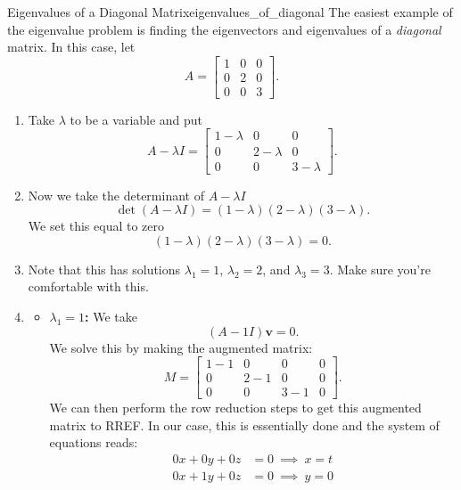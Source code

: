         \begin{ex}{Eigenvalues of a Diagonal Matrix}{eigenvalues_of_diagonal}
        The easiest example of the eigenvalue problem is finding the eigenvectors and eigenvalues of a \emph{diagonal} matrix.  In this case, let
        \[
        A=\begin{bmatrix}
        1 & 0 & 0\\
        0 & 2 & 0\\
        0 & 0 & 3
        \end{bmatrix}.
        \]
        \begin{enumerate}
            \item Take $\lambda$ to be a variable and put
            \[
            A-\lambda I = \begin{bmatrix}
            1-\lambda & 0 & 0\\
            0 & 2-\lambda & 0\\
            0 & 0 & 3-\lambda
            \end{bmatrix}.
            \]
        \item Now we take the determinant of $A-\lambda I$
        \[
        \det(A-\lambda I)= (1-\lambda)(2-\lambda)(3-\lambda).
        \]
        We set this equal to zero
        \[
        (1-\lambda)(2-\lambda)(3-\lambda)=0.
        \]
        \item Note that this has solutions $\lambda_1=1$, $\lambda_2=2$, and $\lambda_3=3$.  Make sure you're comfortable with this.
        \item 
        \begin{itemize}
            \item \textbf{$\lambda_1=1$:} We take
            \[
            (A-1I)\mathbf{v}=0.
            \]
            We solve this by making the augmented matrix:
            \[
            M=\left[ \begin{array}{ccc|c}
                 1-1 & 0 & 0 & 0\\
                 0 & 2-1 & 0 & 0\\
                 0 & 0 & 3-1 & 0
            \end{array}\right].
            \]
            We can then perform the row reduction steps to get this augmented matrix to RREF.  In our case, this is essentially done and the system of equations reads:
            \begin{align*}
                0x+0y+0z&=0 ~\implies~ x=t\\
                0x+1y+0z&=0 ~\implies~ y=0\\

\end{align*}
\end{itemize}
\end{enumerate}
\end{ex}
